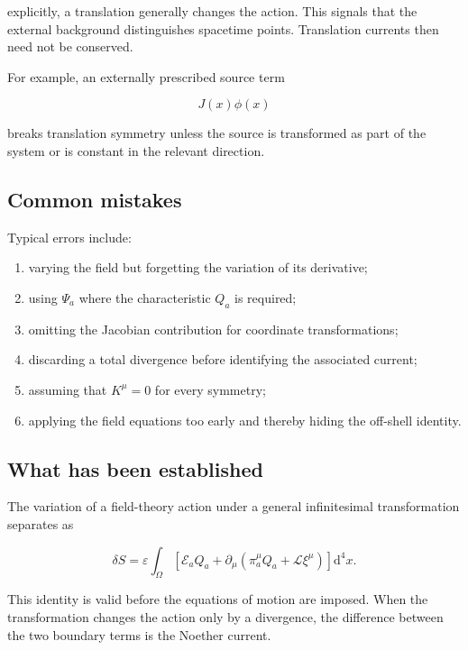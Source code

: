 explicitly, a translation generally changes the action. This signals that the external background distinguishes spacetime points. Translation currents then need not be conserved.

For example, an externally prescribed source term

\[
J(x)\phi(x)
\]

breaks translation symmetry unless the source is transformed as part of the system or is constant in the relevant direction.

\subsection{Common mistakes}

Typical errors include:

\begin{enumerate}
    \item varying the field but forgetting the variation of its derivative;
    \item using \(\Psi_a\) where the characteristic \(Q_a\) is required;
    \item omitting the Jacobian contribution for coordinate transformations;
    \item discarding a total divergence before identifying the associated current;
    \item assuming that \(K^{\mu}=0\) for every symmetry;
    \item applying the field equations too early and thereby hiding the off-shell identity.
\end{enumerate}

\subsection{What has been established}

The variation of a field-theory action under a general infinitesimal transformation separates as

\[
\delta S
=
\varepsilon
\int_{\Omega}
\left[
\mathcal{E}_aQ_a
+
\partial_{\mu}
\left(
\pi_a^{\mu}Q_a+\mathcal{L}\xi^{\mu}
\right)
\right]
\mathrm{d}^{4}x.
\]

This identity is valid before the equations of motion are imposed. When the transformation changes the action only by a divergence, the difference between the two boundary terms is the Noether current.
